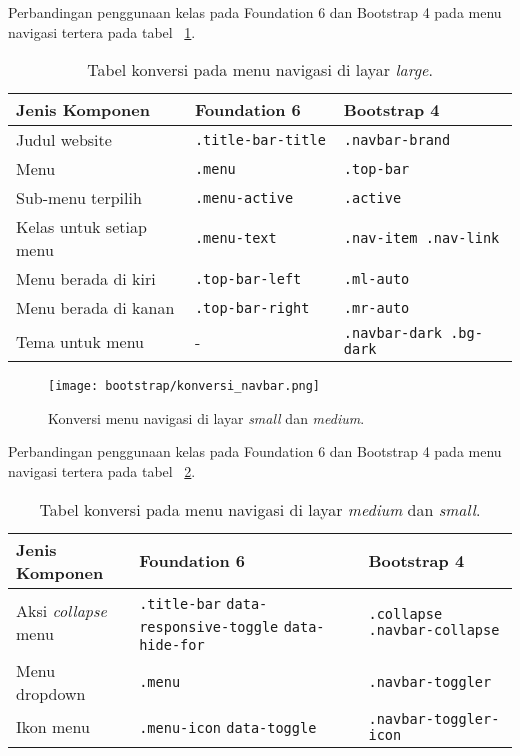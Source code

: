 \noindent Perbandingan penggunaan kelas pada Foundation 6 dan Bootstrap 4 pada menu navigasi tertera pada tabel ~\ref{table:konversiNavigasi}.\\
\begin{table}[H]
	\caption{Tabel konversi pada menu navigasi di layar \textit{large}.}
	\begin{tabular}{| p{} | p{} | p{} |} 
		\hline
		\textbf{Jenis Komponen} & \textbf{Foundation 6} & \textbf{Bootstrap 4}  \\ [0.5ex] 
		\hline	
		 Judul website & \texttt{.title-bar-title }& \texttt{.navbar-brand}  \\ 
		\hline
		Menu &\texttt{.menu }& \texttt{.top-bar } \\
		\hline
		Sub-menu terpilih & \texttt{.menu-active} & \texttt{.active}  \\
		\hline	
		Kelas untuk setiap menu & \texttt{.menu-text} & \texttt{.nav-item .nav-link} \\
		\hline	
		Menu berada di kiri & \texttt{.top-bar-left} & \texttt{.ml-auto}  \\
		\hline
		Menu berada di kanan & \texttt{.top-bar-right} & \texttt{.mr-auto}  \\
		\hline
		Tema untuk menu & - & \texttt{.navbar-dark .bg-dark}\\ [1ex] 
		\hline
	\end{tabular}
	\label{table:konversiNavigasi}
\end{table}

\begin{figure} [H]
	\centering  
	\texttt{[image: bootstrap/konversi\_navbar.png]}  
	\caption{Konversi menu navigasi di layar \textit{small} dan \textit{medium}.} 
	\label{fig:konversiNavigasiSmall}
\end{figure}

\noindent Perbandingan penggunaan kelas pada Foundation 6 dan Bootstrap 4 pada menu navigasi tertera pada tabel ~\ref{table:konversiNavigasiSmall}.\\
\begin{table}[H]
	\caption{Tabel konversi pada menu navigasi di layar \textit{medium} dan \textit{small}.}
	\begin{tabular}{| p{} | p{} | p{} |} 
		\hline
		\textbf{Jenis Komponen} & \textbf{Foundation 6} & \textbf{Bootstrap 4}  \\ [0.5ex] 
		\hline	
		Aksi \textit{collapse} menu & \texttt{.title-bar} \texttt{data-responsive-toggle} \texttt{data-hide-for} & \texttt{.collapse} \texttt{.navbar-collapse}  \\ 
		\hline
		Menu dropdown & \texttt{.menu }& \texttt{.navbar-toggler } \\
		\hline
		Ikon menu & \texttt{.menu-icon} \texttt{data-toggle} & \texttt{.navbar-toggler-icon}  \\ [1ex] 
		\hline
	\end{tabular}
	\label{table:konversiNavigasiSmall}
\end{table}

